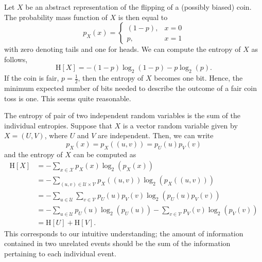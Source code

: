 \begin{example} \label{example:EntropyFairCoin}
Let $X$ be an abstract representation of the flipping of a (possibly biased) coin.
The probability mass function of $X$ is then equal to
\begin{equation*}
p_X(x) = \begin{cases} (1-p), & x = 0 \\
p, & x = 1 \end{cases}
\end{equation*}
with zero denoting tails and one for heads.
We can compute the entropy of $X$ as follows,
\begin{equation*}
\mathrm{H}[X] = - (1-p) \log_2 (1-p)
- p \log_2 (p) .
\end{equation*}
If the coin is fair, $p = \frac{1}{2}$, then the entropy of $X$ becomes one  bit.
Hence, the minimum expected number of bits needed to describe the outcome of a fair coin toss is one.
This seems quite reasonable.
\end{example}

%
%

The entropy of pair of two independent random variables is the sum of the individual entropies.
Suppose that $X$ is a vector random variable given by $X = (U, V)$, where $U$ and $V$ are independent.
Then, we can write
\begin{equation*}
p_X(x) = p_X((u, v)) = p_{U} (u) p_{V} (v)
\end{equation*}
and the entropy of $X$ can be computed as
\begin{equation*}
\begin{split}
\mathrm{H}[X] &= - \sum_{ x \in \mathcal{X} } p_X(x) \log_2 ( p_X(x) ) \\
&= - \sum_{(u, v) \in \mathcal{U} \times \mathcal{V}}
p_X((u, v)) \log_2 ( p_X((u, v)) ) \\
&= - \sum_{u \in \mathcal{U}} \sum_{v \in \mathcal{V}}
p_{U} (u) p_{V} (v) \log_2 ( p_{U} (u) p_{V} (v) ) \\
&= - \sum_{u \in \mathcal{U}}
p_{U} (u) \log_2 ( p_{U} (u) )
- \sum_{v \in \mathcal{V}}
p_{V} (v) \log_2 ( p_{V} (v) ) \\
&= \mathrm{H}[U] + \mathrm{H}[V] .
\end{split}
\end{equation*}
This corresponds to our intuitive understanding; the amount of information contained in two unrelated events should be the sum of the information pertaining to each individual event.


